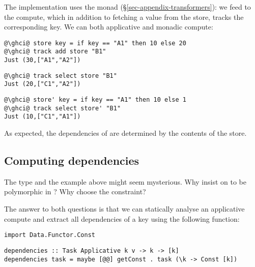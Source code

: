 \noindent
The implementation uses the  monad (\S\ref{sec-appendix-transformers}):
we feed  to the compute, which in addition
to fetching a value from the store, tracks the corresponding key. We can
 both applicative and monadic compute:

\vspace{1mm}
\begin{verbatim}
@\ghci@ store key = if key == "A1" then 10 else 20
@\ghci@ track add store "B1"
Just (30,["A1","A2"])
\end{verbatim}
\vspace{1mm}
\begin{verbatim}
@\ghci@ track select store "B1"
Just (20,["C1","A2"])
\end{verbatim}
\vspace{1mm}
\begin{verbatim}
@\ghci@ store' key = if key == "A1" then 10 else 1
@\ghci@ track select store' "B1"
Just (10,["C1","A1"])
\end{verbatim}
\vspace{1mm}

\noindent
As expected, the dependencies of  are determined by the contents of
the store.

\subsection{Computing dependencies}\label{sec-deps}

The  type and the example above might seem mysterious. Why insist on
 to be polymorphic in ? Why choose the 
constraint?

The answer to both questions is that we can statically analyse an applicative
compute and extract all dependencies of a key using the following function:

\vspace{1mm}
\begin{verbatim}
import Data.Functor.Const
\end{verbatim}
\vspace{0.5mm}
\begin{verbatim}
dependencies :: Task Applicative k v -> k -> [k]
dependencies task = maybe [@@] getConst . task (\k -> Const [k])
\end{verbatim}
\vspace{1mm}

